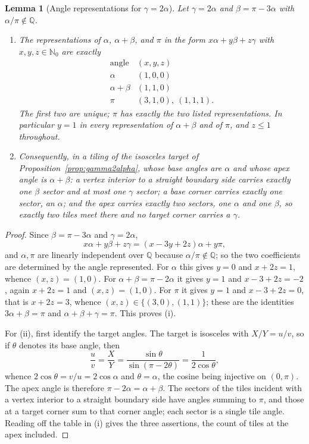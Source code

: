 \documentclass[11pt]{amsart}
\newtheorem{lemma}[theorem]{Lemma}
\theoremstyle{definition}
\theoremstyle{remark}
\newcommand{\Q}{\mathbb Q}
\newcommand{\Nzero}{\mathbb N_0}
\begin{document}
\begin{lemma}[Angle representations for $\gamma=2\alpha$]\label{lem:g2a-angles}
Let $\gamma=2\alpha$ and $\beta=\pi-3\alpha$ with $\alpha/\pi\notin\Q$.
\begin{enumerate}[label=\textup{(\roman*)}]
\item The representations of $\alpha$, $\alpha+\beta$, and $\pi$ in the form
$x\alpha+y\beta+z\gamma$ with $x,y,z\in\Nzero$ are exactly
\[
\begin{array}{c|l}
\text{angle}&(x,y,z)\\
\hline
\alpha&(1,0,0)\\
\alpha+\beta&(1,1,0)\\
\pi&(3,1,0),\ (1,1,1).
\end{array}
\]
The first two are unique; $\pi$ has exactly the two listed representations.
In particular $y=1$ in every representation of $\alpha+\beta$ and of $\pi$,
and $z\le1$ throughout.
\item Consequently, in a tiling of the isosceles target of
Proposition~\ref{prop:gamma2alpha}, whose base angles are $\alpha$ and whose
apex angle is $\alpha+\beta$: a vertex interior to a straight boundary side
carries exactly one $\beta$ sector and at most one $\gamma$ sector; a base
corner carries exactly one sector, an $\alpha$; and the apex carries exactly
two sectors, one $\alpha$ and one $\beta$, so exactly two tiles meet there and
no target corner carries a $\gamma$.
\end{enumerate}
\end{lemma}

\begin{proof}
Since $\beta=\pi-3\alpha$ and $\gamma=2\alpha$,
\[
 x\alpha+y\beta+z\gamma=(x-3y+2z)\alpha+y\pi ,
\]
and $\alpha,\pi$ are linearly independent over $\Q$ because
$\alpha/\pi\notin\Q$; so the two coefficients are determined by the angle
represented.  For $\alpha$ this gives $y=0$ and $x+2z=1$, whence
$(x,z)=(1,0)$.  For $\alpha+\beta=\pi-2\alpha$ it gives $y=1$ and
$x-3+2z=-2$, again $x+2z=1$ and $(x,z)=(1,0)$.  For $\pi$ it gives $y=1$ and
$x-3+2z=0$, that is $x+2z=3$, whence $(x,z)\in\{(3,0),(1,1)\}$; these are the
identities $3\alpha+\beta=\pi$ and $\alpha+\beta+\gamma=\pi$.  This proves
(i).

For (ii), first identify the target angles.  The target is isosceles with
$X/Y=u/v$, so if $\theta$ denotes its base angle, then
\[
 \frac uv=\frac XY=\frac{\sin\theta}{\sin(\pi-2\theta)}
 =\frac1{2\cos\theta},
\]
whence $2\cos\theta=v/u=2\cos\alpha$ and $\theta=\alpha$, the cosine being
injective on $(0,\pi)$.  The apex angle is therefore
$\pi-2\alpha=\alpha+\beta$.  The sectors of the
tiles incident with a vertex interior to a straight boundary side have angles
summing to $\pi$, and those at a target corner sum to that corner angle; each
sector is a single tile angle.  Reading off the table in (i) gives the three
assertions, the count of tiles at the apex included.
\end{proof}
\end{document}
